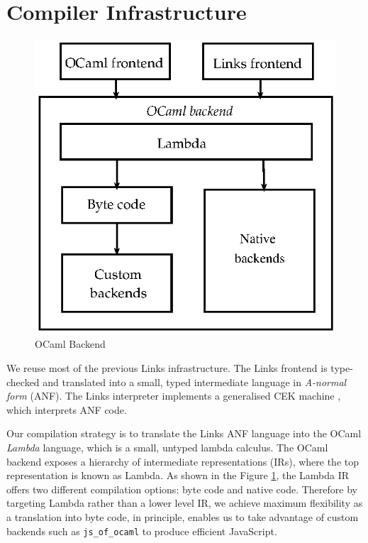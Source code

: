 \documentclass[preprint,numbers]{sigplanconf}
\newcommand{\msgbox}[2]{{%
  \par\noindent\small\color{red}%
  \framebox{\parbox{\dimexpr\linewidth-2\fboxsep-2\fboxrule}{\textbf{#1:} #2}}%
}}
\newcommand{\dhil}[1]{\msgbox{Daniel}{#1}}
\begin{document}
\section{Compiler Infrastructure}
\begin{figure}
  \centering
  \includegraphics[scale=0.8]{infrastructure-alt.eps}
  \caption{OCaml Backend}\label{fig:infra-diagram}
\end{figure}
We reuse most of the previous Links infrastructure. The Links frontend
is type-checked and translated into a small, typed intermediate
language in \emph{A-normal form} (ANF). The Links interpreter
implements a generalised CEK machine \cite{Hillerstrom2016}, which
interprets ANF code.

Our compilation strategy is to translate the Links ANF language into the OCaml
\emph{Lambda} language, which is a small, untyped lambda calculus. The OCaml
backend exposes a hierarchy of intermediate representations (IRs), where the
top representation is known as Lambda. As shown in the Figure
\ref{fig:infra-diagram}, the Lambda IR offers two different compilation
options: byte code and native code. Therefore by targeting Lambda rather than
a lower level IR, we achieve maximum flexibility as a translation into byte
code, in principle, enables us to take advantage of custom backends such as
\texttt{js\_of\_ocaml} to produce efficient JavaScript.
\end{document}
